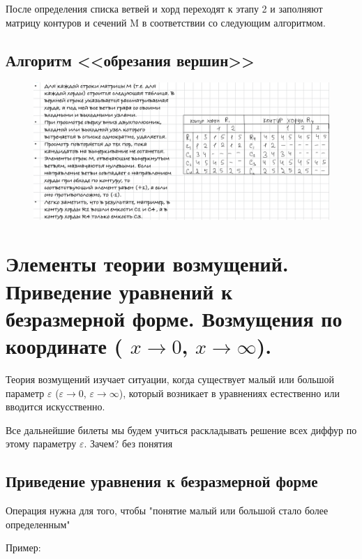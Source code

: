 	После определения списка ветвей и хорд переходят к этапу 2 и заполняют матрицу 
	контуров и сечений M в соответствии со следующим алгоритмом.
	
	\subsection{Алгоритм <<обрезания вершин>>}
	
	\begin{figure}[H]
		\centering
		\includegraphics[width=1\linewidth, height=0.2\textheight]{img/25_03}
		\label{fig:25_03}
	\end{figure}
	
	\newpage
	
	
	\section{Элементы теории возмущений. Приведение уравнений к безразмерной форме. Возмущения по координате ( \(x \to 0\), \(x \to \infty\)).}
	
	Теория возмущений изучает ситуации, когда существует малый или большой параметр $\varepsilon$ ($\varepsilon \to 0$, $\varepsilon \to \infty$), который возникает в уравнениях естественно или вводится искусственно. 
	
	Все дальнейшие билеты мы будем учиться раскладывать решение всех диффур по этому параметру $\varepsilon$. Зачем? без понятия
	
	\subsection{Приведение уравнения к безразмерной форме}
	
	Операция нужна для того, чтобы "понятие малый или большой стало более определенным"
	
	Пример:
	

